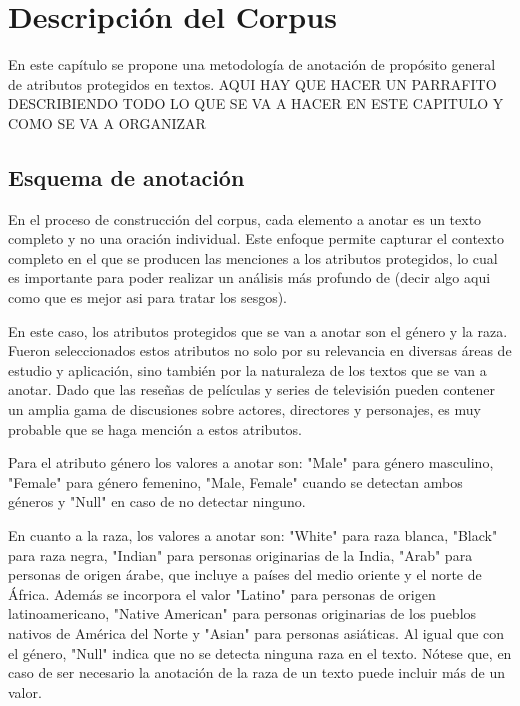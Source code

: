 \chapter{Descripci\'on del Corpus}\label{chapter:proposal}
En este cap\'itulo se propone una metodolog\'ia de anotaci\'on de prop\'osito general de atributos protegidos
en textos. 
AQUI HAY QUE HACER UN PARRAFITO DESCRIBIENDO TODO LO QUE SE VA A HACER EN ESTE CAPITULO Y COMO SE VA A ORGANIZAR

\section{Esquema de anotaci\'on}
En el proceso de construcci\'on del corpus, cada elemento a anotar es un texto completo y no una oraci\'on individual. 
Este enfoque permite capturar el contexto completo en el que se producen las menciones a los atributos protegidos, 
lo cual es importante para poder realizar un an\'alisis m\'as profundo de (decir algo aqui como que es mejor asi para tratar los sesgos).

En este caso, los atributos protegidos que se van a anotar son el g\'enero y la raza.
Fueron seleccionados estos atributos no solo por su relevancia en diversas \'areas de estudio y aplicaci\'on, sino tambi\'en 
por la naturaleza de los textos que se van a anotar. Dado que las rese\~nas de pel\'iculas y series de televisi\'on
pueden contener un amplia gama de discusiones sobre actores, directores y personajes, es muy probable que se haga menci\'on a 
estos atributos.

Para el atributo g\'enero los valores a anotar son: "Male" para g\'enero masculino, "Female" para g\'enero femenino, 
"Male, Female" cuando se detectan ambos g\'eneros y "Null" en caso de no detectar ninguno.

En cuanto a la raza, los valores a anotar son: "White" para raza blanca, "Black" para raza negra, "Indian" para 
personas originarias de la India, "Arab" para personas de origen \'arabe, que incluye a pa\'ises del medio oriente y el norte de \'Africa.
Adem\'as se incorpora el valor "Latino" para personas de origen latinoamericano, "Native American" para personas originarias de 
los pueblos nativos de Am\'erica del Norte y "Asian" para personas asi\'aticas. Al igual que con el g\'enero, "Null" indica que no se detecta
ninguna raza en el texto. N\'otese que, en caso de ser necesario la anotaci\'on de la raza de un texto puede incluir m\'as de un valor.

